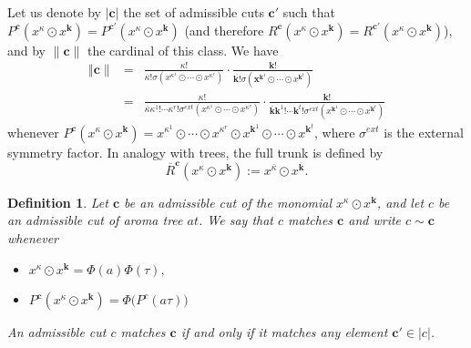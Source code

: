 \documentclass[a4paper,11pt]{article}
\newtheorem{definition}[theorem]{Definition}
\begin{document}
Let us denote by $\vert \mathbf c \vert$ the set of admissible cuts $\mathbf c'$ such that $P^{\mathbf c}(x^{\kappa}\odot  x^{\mathbf k})=P^{\mathbf c'}(x^{\kappa} \odot x^{\mathbf k})$ (and therefore $R^{\mathbf c}(x^{\kappa}\odot  x^{\mathbf k})=R^{\mathbf c'}(x^{\kappa}\odot x^{\mathbf k})$), and by $\| \mathbf c \|$ the cardinal of this class. We have 
\begin{eqnarray*}
\mathbf \|\mathbf c\| & = &\frac{\kappa!}{\overline{\kappa}!\sigma(x^{\kappa^1}\odot \cdots\odot x^{\kappa^r})}\cdot \frac{\mathbf k!}{\overline{\mathbf k!}\sigma(\mathbf x^{\mathbf k^1}\odot \cdots\odot x^{\mathbf k^t})}\\
& = & \frac{\kappa!}{\overline{\kappa}\kappa^1!\cdots \kappa^r!\sigma^{ext}(x^{\kappa^1}\odot\cdots\odot x^{\kappa^r})}\cdot \frac{\mathbf k!}{\overline{\mathbf k}\mathbf k^1!\cdots \mathbf k^t!\sigma^{ext}(x^{\mathbf k^1}\odot \cdots\odot  x^{\mathbf k^t})}
\end{eqnarray*}
whenever $P^{\mathbf c}(x^{\kappa}\odot x^{\mathbf k})=x^{\kappa^1}\odot \cdots\odot  x^{\kappa^r}\odot x^{\mathbf k^1}\odot \cdots\odot x^{\mathbf k^t}$, where $\sigma^{ext}$ is the external symmetry factor. In analogy with trees, the full trunk is defined by 
\[\overline{R}^{\mathbf c}(x^{\kappa}\odot x^{\mathbf k}):= x^{\overline{\kappa}}\odot x^{\overline{\mathbf k}}.\]

\begin{definition}\label{admcut}
 Let $\mathbf c$ be an admissible cut of the monomial $x^{\kappa}\odot x^{\mathbf k}$, and let $c$ be an admissible cut of aroma tree $at$. We say that $c$ matches $\mathbf c$ and write $c \sim \mathbf c$ whenever
 \begin{itemize}
 \item $x^{\kappa}\odot x^{\mathbf k}=\Phi(a)\Phi(\tau),$
 \item $P^{\mathbf c}(x^{\kappa }\odot x^{\mathbf k})= \Phi\big( P^{c}(a\tau)\big)$
 \end{itemize}
 An admissible cut $c$ matches $\mathbf c$ if and only if it matches any element $\mathbf c' \in \vert c \vert$. 
\end{definition}
\end{document}
